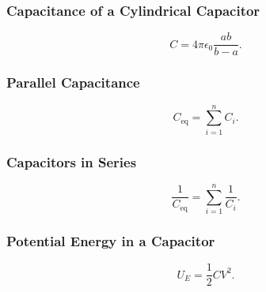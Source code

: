 \begin{symbols}
\end{symbols}

\subsubsection{Capacitance of a Cylindrical Capacitor}
\begin{equation*}
  C = 4 \pi \epsilon_0 \frac{ab}{b-a}
.\end{equation*}

\begin{symbols}
\end{symbols}


\subsubsection{Parallel Capacitance}
\begin{equation*}
  C_{\mathrm{eq}} = \sum_{i = 1}^{n} C_i
.\end{equation*}

\begin{symbols}
\end{symbols}

\subsubsection{Capacitors in Series}
\begin{equation*}
  \frac{1}{C_{\mathrm{eq}}} = \sum_{i = 1}^{n} \frac{1}{C_i}
.\end{equation*}

\begin{symbols}
\end{symbols}

\subsubsection{Potential Energy in a Capacitor}
\begin{equation*}
  U_E = \frac{1}{2} C V^2
.\end{equation*}

